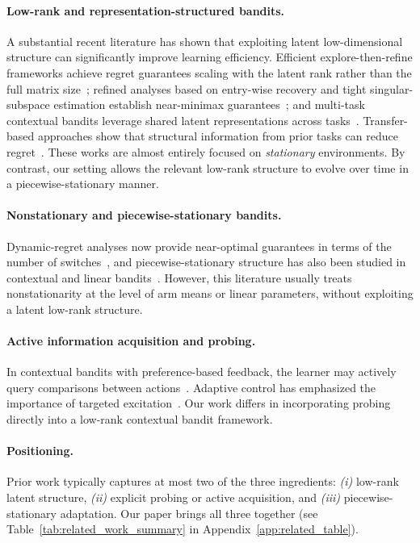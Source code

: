 \documentclass{article}
\begin{document}
\paragraph{Low-rank and representation-structured bandits.}
A substantial recent literature has shown that exploiting latent low-dimensional structure can significantly improve learning efficiency.
Efficient explore-then-refine frameworks achieve regret guarantees scaling with the latent rank rather than the full matrix size~\citep{kang2022gestt}; refined analyses based on entry-wise recovery and tight singular-subspace estimation establish near-minimax guarantees~\citep{stojanovic2023spectral,pmlr-v235-jedra24a,pmlr-v235-jang24e}; and multi-task contextual bandits leverage shared latent representations across tasks~\citep{pmlr-v235-lin24o,russo2023globalLocal}.
Transfer-based approaches show that structural information from prior tasks can reduce regret~\citep{cai2024transfer,park2024latentcontinuity}.
These works are almost entirely focused on \emph{stationary} environments.
By contrast, our setting allows the relevant low-rank structure to evolve over time in a piecewise-stationary manner.

\paragraph{Nonstationary and piecewise-stationary bandits.}
Dynamic-regret analyses now provide near-optimal guarantees in terms of the number of switches~\citep{abbasi2023dynamic,komiyama2024adr}, and piecewise-stationary structure has also been studied in contextual and linear bandits~\citep{hou2024pslb,pmlr-v267-lazzaro25a}.
However, this literature usually treats nonstationarity at the level of arm means or linear parameters, without exploiting a latent low-rank structure.

\paragraph{Active information acquisition and probing.}
In contextual bandits with preference-based feedback, the learner may actively query comparisons between actions~\citep{sekhari2023aurora}.
Adaptive control has emphasized the importance of targeted excitation~\citep{memmel2024asid,xu2025leqr}.
Our work differs in incorporating probing directly into a low-rank contextual bandit framework.

\paragraph{Positioning.}
Prior work typically captures at most two of the three ingredients: \emph{(i)} low-rank latent structure, \emph{(ii)} explicit probing or active acquisition, and \emph{(iii)} piecewise-stationary adaptation.
Our paper brings all three together (see Table~\ref{tab:related_work_summary} in Appendix~\ref{app:related_table}).
\end{document}
